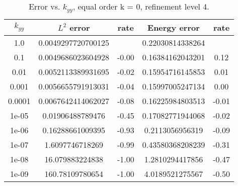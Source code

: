 \documentclass[10pt]{article}
\begin{document}
\begin{table}[ht]
\centering
\caption{Error vs. $k_{yy}$, equal order k = 0, refinement level 4.}
\begin{tabular}{c|cc|cc}
$k_{yy}$  &   $L^2$ error       &  rate    & Energy error & rate \\
\hline
1.0     &   0.0049297720700125  &         & 0.22030814338264 &                  \\
0.1     &   0.0049686023604928  &   -0.00 & 0.16384162043201 &  0.12 \\
0.01    &   0.0052113389931695  &   -0.02 & 0.15954716145853 &  0.01 \\
0.001   &   0.0056655791913031  &   -0.04 & 0.15997005247134 &  0.00 \\
0.0001  &   0.0067642414062027  &   -0.08 & 0.16225984803513 & -0.01 \\
1e-05   &   0.01906488789476    &   -0.45 & 0.17082771944068 & -0.02 \\
1e-06   &   0.16288661009395    &   -0.93 & 0.2113056956319  & -0.09 \\
1e-07   &   1.6097746718269     &   -0.99 & 0.43580368208239 & -0.31 \\
1e-08   &   16.079883224838     &   -1.00 & 1.2810294417856  & -0.47 \\
1e-09   &   160.78109780654     &   -1.00 & 4.0189521275567  & -0.50 \\
\end{tabular}                             
\end{table}

  \begin{figure}[ht]
    \centering
      \scalebox{0.4}{}%
      \scalebox{0.4}{}%
      \scalebox{0.4}{}
      \scalebox{0.4}{}%
      \scalebox{0.4}{}%
      \scalebox{0.4}{}
      \scalebox{0.4}{}%
      \scalebox{0.4}{}%
      \scalebox{0.4}{}
  \end{figure}

  \begin{figure}[ht]
    \centering
      \scalebox{0.4}{}%
      \scalebox{0.4}{}%
      \scalebox{0.4}{}
      \scalebox{0.4}{}%
      \scalebox{0.4}{}%
      \scalebox{0.4}{}
      \scalebox{0.4}{}%
      \scalebox{0.4}{}%
      \scalebox{0.4}{}
  \end{figure}
\end{document}
